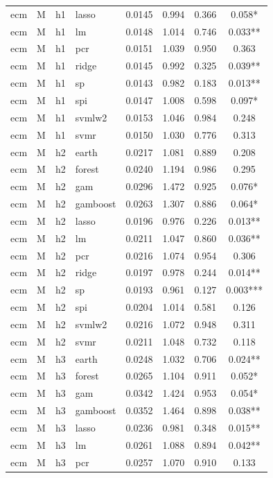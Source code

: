 \begin{ThreePartTable}
\begin{longtable}[t]{llclcccc}
ecm & M & h1 & lasso & 0.0145 & 0.994 & 0.366 & 0.058*\\
ecm & M & h1 & lm & 0.0148 & 1.014 & 0.746 & 0.033**\\
ecm & M & h1 & pcr & 0.0151 & 1.039 & 0.950 & 0.363\\
ecm & M & h1 & ridge & 0.0145 & 0.992 & 0.325 & 0.039**\\
ecm & M & h1 & sp & 0.0143 & 0.982 & 0.183 & 0.013**\\
ecm & M & h1 & spi & 0.0147 & 1.008 & 0.598 & 0.097*\\
ecm & M & h1 & svmlw2 & 0.0153 & 1.046 & 0.984 & 0.248\\
ecm & M & h1 & svmr & 0.0150 & 1.030 & 0.776 & 0.313\\
\addlinespace
ecm & M & h2 & earth & 0.0217 & 1.081 & 0.889 & 0.208\\
ecm & M & h2 & forest & 0.0240 & 1.194 & 0.986 & 0.295\\
ecm & M & h2 & gam & 0.0296 & 1.472 & 0.925 & 0.076*\\
ecm & M & h2 & gamboost & 0.0263 & 1.307 & 0.886 & 0.064*\\
ecm & M & h2 & lasso & 0.0196 & 0.976 & 0.226 & 0.013**\\
ecm & M & h2 & lm & 0.0211 & 1.047 & 0.860 & 0.036**\\
ecm & M & h2 & pcr & 0.0216 & 1.074 & 0.954 & 0.306\\
ecm & M & h2 & ridge & 0.0197 & 0.978 & 0.244 & 0.014**\\
ecm & M & h2 & sp & 0.0193 & 0.961 & 0.127 & 0.003***\\
ecm & M & h2 & spi & 0.0204 & 1.014 & 0.581 & 0.126\\
ecm & M & h2 & svmlw2 & 0.0216 & 1.072 & 0.948 & 0.311\\
ecm & M & h2 & svmr & 0.0211 & 1.048 & 0.732 & 0.118\\
\addlinespace
ecm & M & h3 & earth & 0.0248 & 1.032 & 0.706 & 0.024**\\
ecm & M & h3 & forest & 0.0265 & 1.104 & 0.911 & 0.052*\\
ecm & M & h3 & gam & 0.0342 & 1.424 & 0.953 & 0.054*\\
ecm & M & h3 & gamboost & 0.0352 & 1.464 & 0.898 & 0.038**\\
ecm & M & h3 & lasso & 0.0236 & 0.981 & 0.348 & 0.015**\\
ecm & M & h3 & lm & 0.0261 & 1.088 & 0.894 & 0.042**\\
ecm & M & h3 & pcr & 0.0257 & 1.070 & 0.910 & 0.133\\

\end{longtable}
\end{ThreePartTable}
